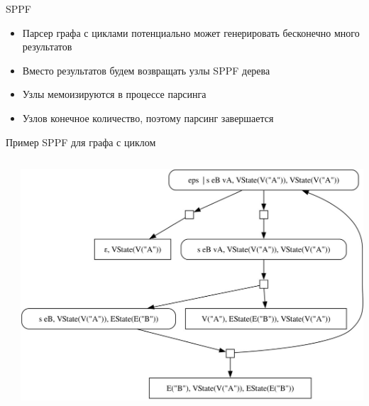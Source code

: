 \documentclass[aspectratio=169]{beamer}
\begin{document}
\begin{frame}[fragile]{SPPF}
  \begin{itemize}
    \item Парсер графа с циклами потенциально может генерировать бесконечно много результатов
    \item Вместо результатов будем возвращать узлы SPPF дерева
    \item Узлы мемоизируются в процессе парсинга
    \item Узлов конечное количество, поэтому парсинг завершается
  \end{itemize}
\end{frame}


\begin{frame}{Пример SPPF для графа с циклом}
  \begin{columns}
    \begin{column}{0.2\textwidth}
    \end{column}
    \begin{column}{0.8\textwidth}
  \raggedright{\includegraphics[scale=0.3]{images/sppf_loop.png}}
    \end{column}
  \end{columns}
\end{frame}
\end{document}
